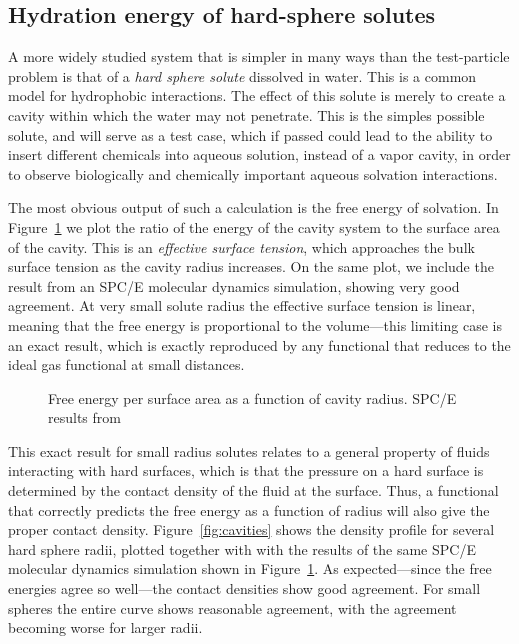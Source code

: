 \documentclass[letterpaper,twocolumn,amsmath,amssymb,prb]{revtex4-1}
\begin{document}
\subsection{Hydration energy of hard-sphere solutes}

A more widely studied system that is simpler in many ways than the
test-particle problem is that of a \emph{hard sphere solute} dissolved
in water.  This is a common model for hydrophobic interactions.  The
effect of this solute is merely to create a cavity within which the
water may not penetrate.  This is the simples possible solute, and
will serve as a test case, which if passed could lead to the ability
to insert different chemicals into aqueous solution, instead of a
vapor cavity, in order to observe biologically and chemically
important aqueous solvation interactions.

The most obvious output of such a calculation is the free energy of
solvation.  In Figure~\ref{fig:surfaceTension} we plot the ratio of the
energy of the cavity system to the surface area of the cavity.  This
is an \emph{effective surface tension}, which approaches the bulk
surface tension as the cavity radius increases.  On the same plot, we
include the result from an SPC/E molecular dynamics
simulation\cite{huang2001shs}, showing very good agreement.  At very
small solute radius the effective surface tension is linear, meaning
that the free energy is proportional to the volume---this limiting
case is an exact result, which is exactly reproduced by any functional
that reduces to the ideal gas functional at small distances.

\begin{figure}
\begin{center}
\end{center}
\caption{Free energy per surface area as a function of cavity
  radius. SPC/E results from~\cite{huang2001shs}}
\label{fig:surfaceTension}
\end{figure}

This exact result for small radius solutes relates to a general property of
fluids interacting with hard surfaces, which is that the pressure on a hard
surface is determined by the contact density of the fluid at the surface.
Thus, a functional that correctly predicts the free energy as a function of
radius will also give the proper contact density.
Figure~\ref{fig:cavities} shows the density profile for several hard sphere
radii, plotted together with with the results of the same SPC/E molecular
dynamics simulation shown in
Figure~\ref{fig:surfaceTension}\cite{huang2001shs}.  As expected---since
the free energies agree so well---the contact densities show good
agreement.  For small spheres the entire curve shows reasonable agreement,
with the agreement becoming worse for larger radii.
\end{document}
